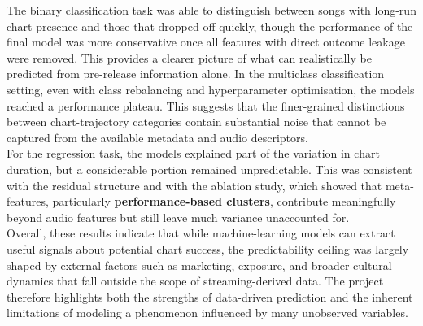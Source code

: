 \documentclass{article}
\begin{document}
The binary classification task was able to distinguish between songs with long-run chart presence and those that dropped off quickly, though the performance of the final model was more conservative once all features with direct outcome leakage were removed. This provides a clearer picture of what can realistically be predicted from pre-release information alone.
In the multiclass classification setting, even with class rebalancing and hyperparameter optimisation, the models reached a performance plateau. This suggests that the finer-grained distinctions between chart-trajectory categories contain substantial noise that cannot be captured from the available metadata and audio descriptors.\\
For the regression task, the models explained part of the variation in chart duration, but a considerable portion remained unpredictable. This was consistent with the residual structure and with the ablation study, which showed that meta-features, particularly \textbf{performance-based clusters}, contribute meaningfully beyond audio features but still leave much variance unaccounted for.\\
Overall, these results indicate that while machine-learning models can extract useful signals about potential chart success, the predictability ceiling was largely shaped by external factors such as marketing, exposure, and broader cultural dynamics that fall outside the scope of streaming-derived data. The project therefore highlights both the strengths of data-driven prediction and the inherent limitations of modeling a phenomenon influenced by many unobserved variables.
\newpage







\newpage
\appendix
\end{document}
